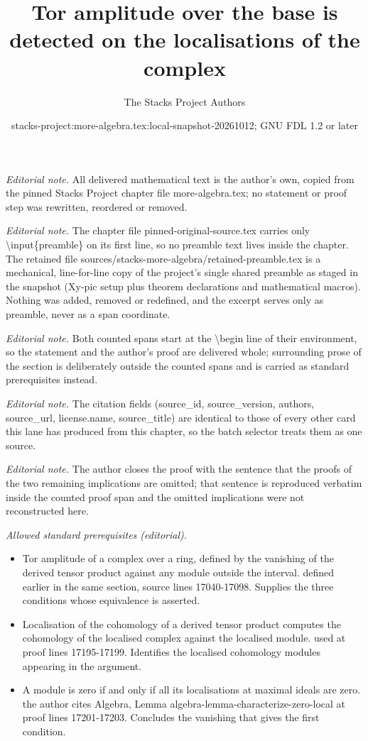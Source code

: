 \documentclass[10pt,a4paper]{amsart}
\title{Tor amplitude over the base is detected on the localisations of the complex}
\author{The Stacks Project Authors}
\date{stacks-project:more-algebra.tex:local-snapshot-20261012; GNU FDL 1.2 or later}
\theoremstyle{plain}
\theoremstyle{definition}
\theoremstyle{remark}
\numberwithin{equation}{subsection}
\begin{document}
\maketitle
\setcounter{subsection}{1}
\noindent\textit{Editorial note.} All delivered mathematical text is the author's own, copied from the pinned Stacks Project chapter file more-algebra.tex; no statement or proof step was rewritten, reordered or removed.\par\medskip
\noindent\textit{Editorial note.} The chapter file pinned-original-source.tex carries only \textbackslash{}input\{preamble\} on its first line, so no preamble text lives inside the chapter. The retained file sources/stacks-more-algebra/retained-preamble.tex is a mechanical, line-for-line copy of the project's single shared preamble as staged in the snapshot (Xy-pic setup plus theorem declarations and mathematical macros). Nothing was added, removed or redefined, and the excerpt serves only as preamble, never as a span coordinate.\par\medskip
\noindent\textit{Editorial note.} Both counted spans start at the \textbackslash{}begin line of their environment, so the statement and the author's proof are delivered whole; surrounding prose of the section is deliberately outside the counted spans and is carried as standard prerequisites instead.\par\medskip
\noindent\textit{Editorial note.} The citation fields (source\_id, source\_version, authors, source\_url, license.name, source\_title) are identical to those of every other card this lane has produced from this chapter, so the batch selector treats them as one source.\par\medskip
\noindent\textit{Editorial note.} The author closes the proof with the sentence that the proofs of the two remaining implications are omitted; that sentence is reproduced verbatim inside the counted proof span and the omitted implications were not reconstructed here.\par\medskip
\noindent\textit{Allowed standard prerequisites (editorial).}\begin{itemize}
\item Tor amplitude of a complex over a ring, defined by the vanishing of the derived tensor product against any module outside the interval. defined earlier in the same section, source lines 17040-17098. Supplies the three conditions whose equivalence is asserted.
\item Localisation of the cohomology of a derived tensor product computes the cohomology of the localised complex against the localised module. used at proof lines 17195-17199. Identifies the localised cohomology modules appearing in the argument.
\item A module is zero if and only if all its localisations at maximal ideals are zero. the author cites Algebra, Lemma algebra-lemma-characterize-zero-local at proof lines 17201-17203. Concludes the vanishing that gives the first condition.
\end{itemize}\medskip
\end{document}
